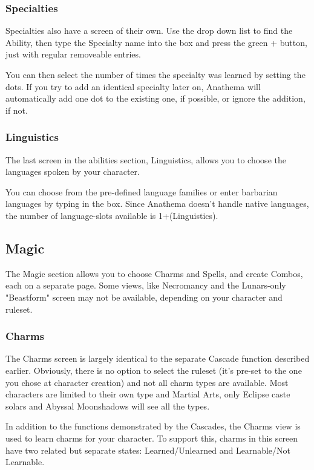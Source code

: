 \subsubsection{Specialties}
Specialties also have a screen of their own. Use the drop down list to find the Ability, then type the Specialty name into the box and press the green + button, just with regular removeable entries.

You can then select the number of times the specialty was learned by setting the dots. If you try to add an identical specialty later on, Anathema will automatically add one dot to the existing one, if possible, or ignore the addition, if not.

\subsubsection{Linguistics}
The last screen in the abilities section, Linguistics, allows you to choose the languages spoken by your character.

You can choose from the pre-defined language families or enter barbarian languages by typing in the box. Since Anathema doesn't handle native languages, the number of language-slots available is 1+(Linguistics).

\subsection{Magic}
The Magic section allows you to choose Charms and Spells, and create Combos, each on a separate page. Some views, like Necromancy and the Lunars-only "Beastform" screen may not be available, depending on your character and ruleset.

\subsubsection{Charms}The Charms screen is largely identical to the separate Cascade function described earlier. Obviously, there is no option to select the ruleset (it's pre-set to the one you chose at character creation) and not all charm types are available. Most characters are limited to their own type and Martial Arts, only Eclipse caste solars and Abyssal Moonshadows will see all the types. 

In addition to the functions demonstrated by the Cascades, the Charms view is used to learn charms for your character. To support this, charms in this screen have two related but separate states: Learned/Unlearned and Learnable/Not Learnable. 

